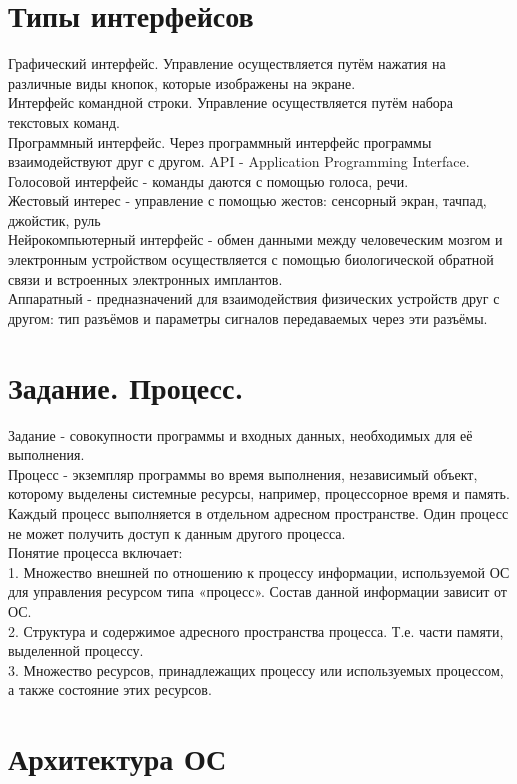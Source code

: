 \documentclass[a4paper]{article}
\begin{document}
\section*{Типы интерфейсов}
Графический интерфейс. Управление осуществляется путём нажатия на различные виды кнопок, которые изображены на экране. \\
Интерфейс командной строки. Управление осуществляется путём набора текстовых команд.\\
Программный интерфейс. Через программный интерфейс программы взаимодействуют друг с другом. API - Application Programming Interface.\\
Голосовой интерфейс - команды даются с помощью голоса, речи.\\
Жестовый интерес - управление с помощью жестов: сенсорный экран, тачпад, джойстик, руль \\
Нейрокомпьютерный интерфейс - обмен данными между человеческим мозгом и электронным устройством осуществляется с помощью биологической обратной связи и встроенных электронных имплантов.\\
Аппаратный - предназначений для взаимодействия физических устройств друг с другом: тип разъёмов и параметры сигналов передаваемых через эти разъёмы.\\
\section*{Задание. Процесс.}
Задание - совокупности программы и входных данных, необходимых для её выполнения. \\
Процесс - экземпляр программы во время выполнения, независимый объект, которому выделены системные ресурсы, например, процессорное время и память. Каждый процесс выполняется в отдельном адресном пространстве. Один процесс не может получить доступ к данным другого процесса.\\
Понятие процесса включает:\\
1. Множество внешней по отношению к процессу информации, используемой ОС для управления ресурсом типа «процесс». Состав данной информации зависит от ОС.\\
2. Структура и содержимое адресного пространства процесса. Т.е. части памяти, выделенной процессу.\\
3. Множество ресурсов, принадлежащих процессу или используемых процессом, а также состояние этих ресурсов.\\
\section*{Архитектура ОС}
\setcounter{section}{1}
\end{document}
